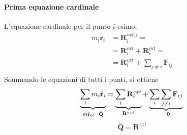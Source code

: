 \paragraph{Prima equazione cardinale}
L'equazione cardinale per il punto $i$-esimo,
\begin{equation}
\begin{aligned}
    m_i \ddot{\mathbf{r}}_i & = \mathbf{R}^{ext,i}_i = \\
    & = \mathbf{R}^{ext}_i + \mathbf{R}^{int}_i = \\
    & = \mathbf{R}^{ext}_i + \sum_{j \ne i} \mathbf{F}_{ij} \\
\end{aligned}
\end{equation}
Sommando le equazioni di tutti i punti, si ottiene
\begin{equation}
    \underbrace{\sum_{i} m_i \ddot{\mathbf{r}}_i}_{m \ddot{\mathbf{r}}_G = \dot{\mathbf{Q}} } = \underbrace{\sum_{i} \mathbf{R}^{ext}_i}_{\mathbf{R}^{ext}} + \underbrace{\sum_{i} \sum_{j \ne i} \mathbf{F}_{ij}}_{=\mathbf{0}} \\
\end{equation}
\begin{equation}
    \dot{\mathbf{Q}} = \mathbf{R}^{ext} 
\end{equation}

